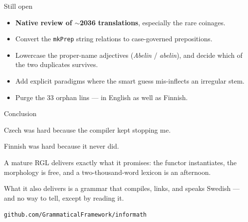 \documentclass[10pt,aspectratio=169]{beamer}
\begin{document}
\begin{frame}{Still open}
  \begin{itemize}
    \item \textbf{Native review of $\sim$2036 translations}, especially the rare coinages.
    \item Convert the \texttt{mkPrep} string relations to case-governed prepositions.
    \item Lowercase the proper-name adjectives (\emph{Abelin} / \emph{abelin}), and
          decide which of the two duplicates survives.
    \item Add explicit paradigms where the smart guess mis-inflects an irregular stem.
    \item Purge the 33 orphan lins --- in English as well as Finnish.
  \end{itemize}
\end{frame}

\begin{frame}{Conclusion}
  \begin{center}
  \Large
  Czech was hard because the compiler kept stopping me.

  \vspace{0.8em}
  Finnish was hard because it never did.
  \end{center}

  \vspace{1.5em}
  \normalsize
  A mature RGL delivers exactly what it promises: the functor instantiates, the
  morphology is free, and a two-thousand-word lexicon is an afternoon.

  \vspace{0.5em}
  What it also delivers is a grammar that compiles, links, and speaks Swedish ---
  and no way to tell, except by reading it.

  \vspace{1em}
  \begin{center}
  \small
  \texttt{github.com/GrammaticalFramework/informath}
  \end{center}
\end{frame}
\end{document}
